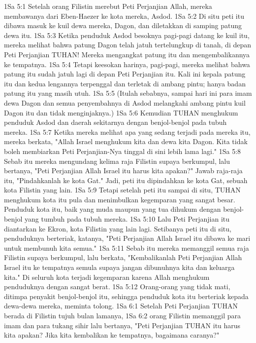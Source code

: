 1Sa 5:1  Setelah orang Filistin merebut Peti Perjanjian Allah, mereka membawanya dari Eben-Haezer ke kota mereka, Asdod.
1Sa 5:2  Di situ peti itu dibawa masuk ke kuil dewa mereka, Dagon, dan diletakkan di samping patung dewa itu.
1Sa 5:3  Ketika penduduk Asdod besoknya pagi-pagi datang ke kuil itu, mereka melihat bahwa patung Dagon telah jatuh tertelungkup di tanah, di depan Peti Perjanjian TUHAN! Mereka mengangkat patung itu dan mengembalikannya ke tempatnya.
1Sa 5:4  Tetapi keesokan harinya, pagi-pagi, mereka melihat bahwa patung itu sudah jatuh lagi di depan Peti Perjanjian itu. Kali ini kepala patung itu dan kedua lengannya terpenggal dan terletak di ambang pintu; hanya badan patung itu yang masih utuh.
1Sa 5:5  (Itulah sebabnya, sampai hari ini para imam dewa Dagon dan semua penyembahnya di Asdod melangkahi ambang pintu kuil Dagon itu dan tidak menginjaknya.)
1Sa 5:6  Kemudian TUHAN menghukum penduduk Asdod dan daerah sekitarnya dengan benjol-benjol pada tubuh mereka.
1Sa 5:7  Ketika mereka melihat apa yang sedang terjadi pada mereka itu, mereka berkata, "Allah Israel menghukum kita dan dewa kita Dagon. Kita tidak boleh membiarkan Peti Perjanjian-Nya tinggal di sini lebih lama lagi."
1Sa 5:8  Sebab itu mereka mengundang kelima raja Filistin supaya berkumpul, lalu bertanya, "Peti Perjanjian Allah Israel itu harus kita apakan?" Jawab raja-raja itu, "Pindahkanlah ke kota Gat." Jadi, peti itu dipindahkan ke kota Gat, sebuah kota Filistin yang lain.
1Sa 5:9  Tetapi setelah peti itu sampai di situ, TUHAN menghukum kota itu pula dan menimbulkan kegemparan yang sangat besar. Penduduk kota itu, baik yang muda maupun yang tua dihukum dengan benjol-benjol yang tumbuh pada tubuh mereka.
1Sa 5:10  Lalu Peti Perjanjian itu diantarkan ke Ekron, kota Filistin yang lain lagi. Setibanya peti itu di situ, penduduknya berteriak, katanya, "Peti Perjanjian Allah Israel itu dibawa ke mari untuk membunuh kita semua."
1Sa 5:11  Sebab itu mereka memanggil semua raja Filistin supaya berkumpul, lalu berkata, "Kembalikanlah Peti Perjanjian Allah Israel itu ke tempatnya semula supaya jangan dibunuhnya kita dan keluarga kita." Di seluruh kota terjadi kegemparan karena Allah menghukum penduduknya dengan sangat berat.
1Sa 5:12  Orang-orang yang tidak mati, ditimpa penyakit benjol-benjol itu, sehingga penduduk kota itu berteriak kepada dewa-dewa mereka, meminta tolong.
1Sa 6:1  Setelah Peti Perjanjian TUHAN berada di Filistin tujuh bulan lamanya,
1Sa 6:2  orang Filistin memanggil para imam dan para tukang sihir lalu bertanya, "Peti Perjanjian TUHAN itu harus kita apakan? Jika kita kembalikan ke tempatnya, bagaimana caranya?"
